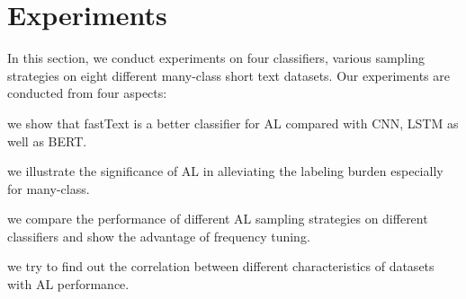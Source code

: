 \section{Experiments}
\label{sec:eval}
In this section, we conduct experiments on four classifiers, various sampling
strategies on eight different many-class short text datasets. 
Our experiments are conducted from four aspects:
\begin{enumerate*}[label=(\arabic*)] 
	\item we show that fastText is a better classifier for AL 
compared with CNN, LSTM as well as BERT. 
	\item we illustrate the significance of AL in alleviating the 
labeling burden especially for many-class. 
	\item we compare the performance of different AL sampling strategies on different classifiers and show the advantage of frequency tuning. 
	\item we try to find out the correlation between different characteristics of datasets with AL performance.
\end{enumerate*}

